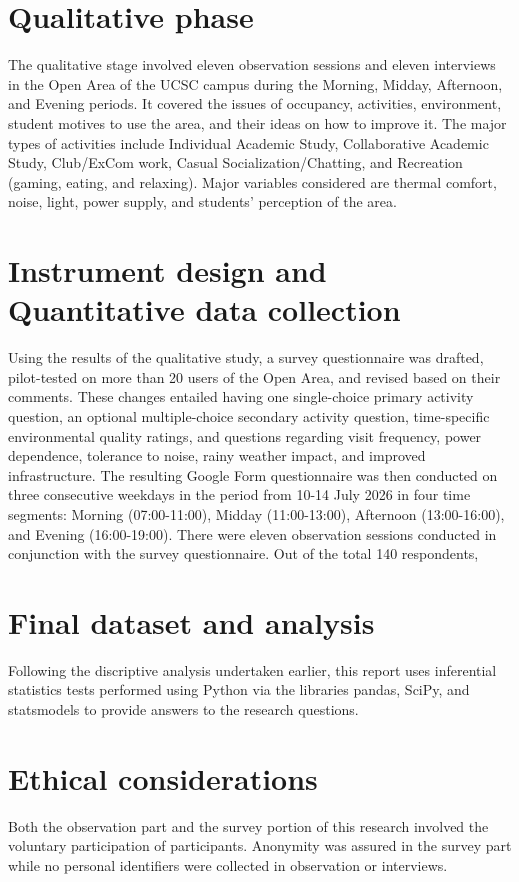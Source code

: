 \documentclass[12pt, a4paper]{report}
\begin{document}
\section{Qualitative phase}
The qualitative stage involved eleven observation sessions and eleven interviews in the Open Area of the UCSC campus during the Morning, Midday, Afternoon, and Evening periods. It covered the issues of occupancy, activities, environment, student motives to use the area, and their ideas on how to improve it. The major types of activities include Individual Academic Study, Collaborative Academic Study, Club/ExCom work, Casual Socialization/Chatting, and Recreation (gaming, eating, and relaxing). Major variables considered are thermal comfort, noise, light, power supply, and students' perception of the area.

\section{Instrument design and Quantitative data collection}
Using the results of the qualitative study, a survey questionnaire was drafted, pilot-tested on more than 20 users of the Open Area, and revised based on their comments. These changes entailed having one single-choice primary activity question, an optional multiple-choice secondary activity question, time-specific environmental quality ratings, and questions regarding visit frequency, power dependence, tolerance to noise, rainy weather impact, and improved infrastructure. The resulting Google Form questionnaire was then conducted on three consecutive weekdays in the period from 10-14 July 2026 in four time segments: Morning (07:00-11:00), Midday (11:00-13:00), Afternoon (13:00-16:00), and Evening (16:00-19:00). There were eleven observation sessions conducted in conjunction with the survey questionnaire. Out of the total 140 respondents,

\section{Final dataset and analysis}
Following the discriptive analysis undertaken earlier, this report uses inferential statistics tests performed using Python via the libraries pandas, SciPy, and statsmodels to provide answers to the research questions. 

\section{Ethical considerations}
Both the observation part and the survey portion of this research involved the voluntary participation of participants. Anonymity was assured in the survey part while no personal identifiers were collected in observation or interviews.
\end{document}
